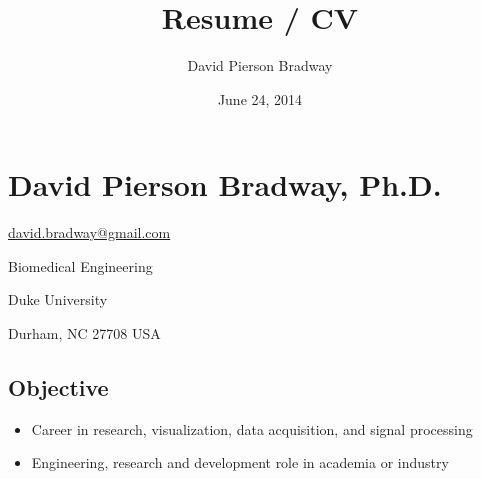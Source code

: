 \documentclass[letterpaper,10pt,english]{sphinxmanual}
\title{Resume / CV}
\date{June 24, 2014}
\author{David Pierson Bradway}
\begin{document}
\maketitle
\tableofcontents
{}\label{index::doc}



\chapter{David Pierson Bradway, Ph.D.}
\label{resume:web-enhanced-resume-cv}\label{resume:david-pierson-bradway-ph-d}\label{resume::doc}
\begin{DUlineblock}{0em}
\item[] \href{mailto:david.bradway@gmail.com}{david.bradway@gmail.com}
\item[] Biomedical Engineering
\item[] Duke University
\item[] Durham, NC 27708 USA
\end{DUlineblock}


\section{Objective}
\label{resume:objective}\begin{itemize}
\item {} 
Career in research, visualization, data acquisition, and signal
processing

\item {} 
Engineering, research and development role in academia or industry

\end{itemize}
\end{document}
